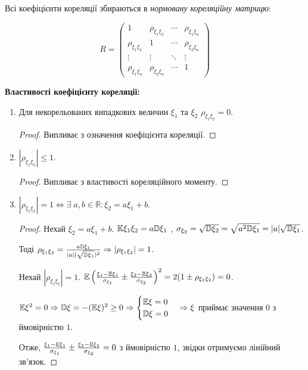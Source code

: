 \begin{definition}
    Всі коефіцієнти кореляції збираються в 
    \emph{нормовану кореляційну матрицю}:

    \begin{equation*}
        R = 
        \begin{pmatrix}
            1 & \rho_{\xi_1\xi_2} & \cdots & \rho_{\xi_1\xi_n} \\
            \rho_{\xi_1\xi_2} & 1 & \cdots & \rho_{\xi_2\xi_n} \\
            \vdots & \vdots & \ddots & \vdots \\
            \rho_{\xi_1\xi_n} & \rho_{\xi_2\xi_n} & \cdots & 1
        \end{pmatrix}
    \end{equation*}

\end{definition}

\noindent \textbf{Властивості коефіцієнту кореляції:}
\begin{enumerate}
    \item Для некорельованих випадкових величин $\xi_1$ та $\xi_2$ 
    $\rho_{\xi_1\xi_2} = 0$.
    \begin{proof}
        Випливає з означення коефіцієнта кореляції.
    \end{proof}
    \item $\left|\rho_{\xi_1\xi_2}\right| \leq 1$.
    \begin{proof}
        Випливає з властивості кореляційного моменту.
    \end{proof}
    \item $\left|\rho_{\xi_1\xi_2}\right| = 1 \Leftrightarrow 
    \exists \; a, b \in \mathbb{R}: \xi_2 = a\xi_1 + b$.
    \begin{proof}
        Нехай 
        $\xi_2 = a\xi_1 + b$. $\mathbb{K}\xi_1\xi_2 = 
        a\mathbb{D}\xi_1$
        , 
        $\sigma_{\xi_2} = \sqrt{\mathbb{D}\xi_2} = \sqrt{a^2\mathbb{D}\xi_1} = 
        |a|\sqrt{\mathbb{D}\xi_1}$.

        Тоді $\rho_{\xi_1\xi_2} = \frac{a\mathbb{D}\xi_1}{|a|(\sqrt{\mathbb{D}\xi_1})^2} 
        \Rightarrow
        \left|\rho_{\xi_1\xi_2}\right| = 1$.

        Нехай $\left|\rho_{\xi_1\xi_2}\right| = 1$.
        $\mathbb{E}\left(\frac{\xi_1 - \mathbb{E}\xi_1}{\sigma_{\xi_1}} 
        \pm \frac{\xi_2 - \mathbb{E}\xi_2}{\sigma_{\xi_2}}\right)^2 = 
        2(1\pm\rho_{\xi_1\xi_2}) = 0$.

        $\mathbb{E}\xi^2 = 0 \Rightarrow \mathbb{D}\xi = -(\mathbb{E}\xi)^2 \geq 0 \Rightarrow \begin{cases}
            \mathbb{E}\xi = 0 \\ \mathbb{D}\xi = 0
        \end{cases} \Rightarrow \xi$ приймає значення $0$ з ймовірністю $1$.

        Отже, $\frac{\xi_1 - \mathbb{E}\xi_1}{\sigma_{\xi_1}} 
        \pm \frac{\xi_2 - \mathbb{E}\xi_2}{\sigma_{\xi_2}} = 0$ з ймовірністю $1$,
        звідки отримуємо лінійний зв'язок.
    \end{proof}
\end{enumerate}